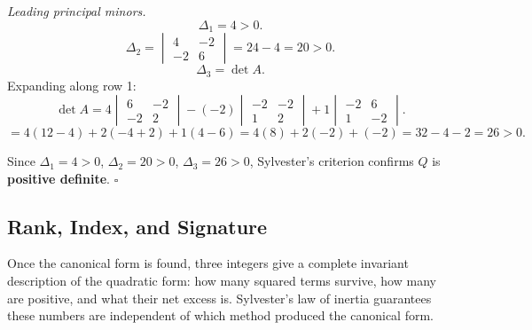 \documentclass[12pt,a4paper]{article}
\begin{document}
\textit{Leading principal minors.}
\[
\Delta_1 = 4 > 0.
\]
\[
\Delta_2 = \begin{vmatrix} 4 & -2 \\ -2 & 6 \end{vmatrix} = 24 - 4 = 20 > 0.
\]
\[
\Delta_3 = \det A.
\]
Expanding along row 1:
\[
\det A = 4\begin{vmatrix}6&-2\\-2&2\end{vmatrix} - (-2)\begin{vmatrix}-2&-2\\1&2\end{vmatrix} + 1\begin{vmatrix}-2&6\\1&-2\end{vmatrix}.
\]
\[
= 4(12-4) + 2(-4+2) + 1(4-6) = 4(8)+2(-2)+(-2) = 32-4-2 = 26 > 0.
\]

Since $\Delta_1 = 4 > 0$, $\Delta_2 = 20 > 0$, $\Delta_3 = 26 > 0$, Sylvester's criterion confirms $Q$ is \textbf{positive definite}. \hfill$\square$

\subsection{Rank, Index, and Signature}

Once the canonical form is found, three integers give a complete invariant description of the quadratic form: how many squared terms survive, how many are positive, and what their net excess is. Sylvester's law of inertia guarantees these numbers are independent of which method produced the canonical form.
\end{document}
